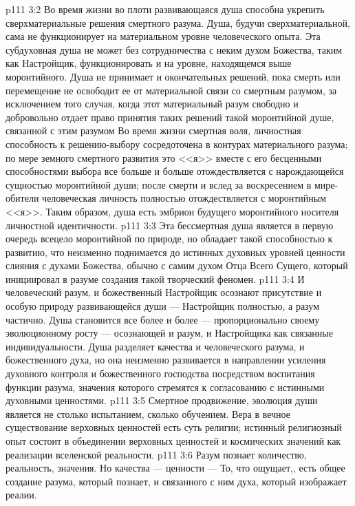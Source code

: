 \vs p111 3:2 Во время жизни во плоти развивающаяся душа способна укрепить сверхматериальные решения смертного разума. Душа, будучи сверхматериальной, сама не функционирует на материальном уровне человеческого опыта. Эта субдуховная душа не может без сотрудничества с неким духом Божества, таким как Настройщик, функционировать и на уровне, находящемся выше моронтийного. Душа не принимает и окончательных решений, пока смерть или перемещение не освободит ее от материальной связи со смертным разумом, за исключением того случая, когда этот материальный разум свободно и добровольно отдает право принятия таких решений такой моронтийной душе, связанной с этим разумом Во время жизни смертная воля, личностная способность к решению\hyp{}выбору сосредоточена в контурах материального разума; по мере земного смертного развития это <<я>> вместе с его бесценными способностями выбора все больше и больше отождествляется с нарождающейся сущностью моронтийной души; после смерти и вслед за воскресением в мире\hyp{}обители человеческая личность полностью отождествляется с моронтийным <<я>>. Таким образом, душа есть эмбрион будущего моронтийного носителя личностной идентичности.
\vs p111 3:3 Эта бессмертная душа является в первую очередь всецело моронтийной по природе, но обладает такой способностью к развитию, что неизменно поднимается до истинных духовных уровней ценности слияния с духами Божества, обычно с самим духом Отца Всего Сущего, который инициировал в разуме создания такой творческий феномен.
\vs p111 3:4 И человеческий разум, и божественный Настройщик осознают присутствие и особую природу развивающейся души --- Настройщик полностью, а разум частично. Душа становится все более и более --- пропорционально своему эволюционному росту --- осознающей и разум, и Настройщика как связанные индивидуальности. Душа разделяет качества и человеческого разума, и божественного духа, но она неизменно развивается в направлении усиления духовного контроля и божественного господства посредством воспитания функции разума, значения которого стремятся к согласованию с истинными духовными ценностями.
\vs p111 3:5 Смертное продвижение, эволюция души является не столько испытанием, сколько обучением. Вера в вечное существование верховных ценностей есть суть религии; истинный религиозный опыт состоит в объединении верховных ценностей и космических значений как реализации вселенской реальности.
\vs p111 3:6 Разум познает количество, реальность, значения. Но качества --- ценности ---  То, что ощущает,, есть общее создание разума, который познает, и связанного с ним духа, который изображает реалии.
